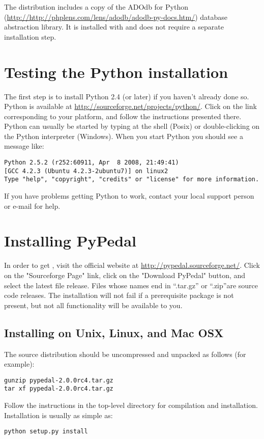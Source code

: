 The \PyPedal{} distribution includes a copy of the ADOdb for Python (\url{http://http://phplens.com/lens/adodb/adodb-py-docs.htm/}) database abstraction library. It is installed with \PyPedal{} and does not require a separate installation step.

\section{Testing the Python installation}
The first step is to install Python 2.4 (or later) if you haven't already done so. Python is available at
\url{http://sourceforge.net/projects/python/}.  Click on the link corresponding to your platform, and follow the instructions presented there. Python can usually be started by typing  at the shell (Posix) or double-clicking on the Python interpreter (Windows).  When you start Python you should see a message like:
\begin{verbatim}
Python 2.5.2 (r252:60911, Apr  8 2008, 21:49:41)
[GCC 4.2.3 (Ubuntu 4.2.3-2ubuntu7)] on linux2
Type "help", "copyright", "credits" or "license" for more information.
\end{verbatim}
If you have problems getting Python to work, contact your local support person or e-mail   for help.

\section{Installing PyPedal}\label{sec:installing-pypedal}
In order to get \PyPedal{}, visit the official website at \url{http://pypedal.sourceforge.net/}. Click on the "Sourceforge Page" link, click on the "Download PyPedal" button, and select the latest file release. Files whose names end in ``.tar.gz'' or ``.zip''are source code releases. The \PyPedal{} installation will not fail if a prerequisite package is not present, but not all \PyPedal{} functionality will be available to you.

\subsection{Installing on Unix, Linux, and Mac OSX}\label{sec:installing-unix}
The source distribution should be uncompressed and unpacked as follows (for example):
\begin{verbatim}
gunzip pypedal-2.0.0rc4.tar.gz
tar xf pypedal-2.0.0rc4.tar.gz
\end{verbatim}
Follow the instructions in the top-level directory for compilation and installation. Installation is usually as simple as:
\begin{verbatim}
python setup.py install
\end{verbatim}
